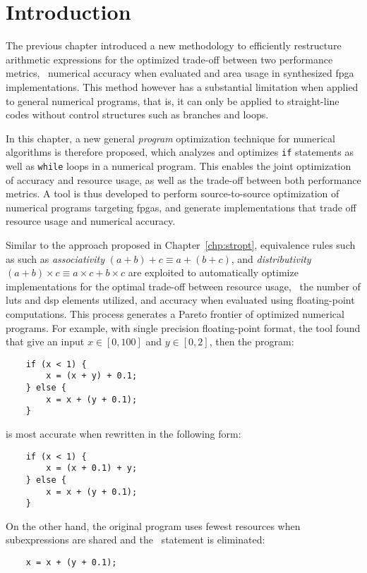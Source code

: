 \section{Introduction}
\label{po:sec:introduction}

The previous chapter introduced a new methodology to efficiently restructure
arithmetic expressions for the optimized trade-off between two performance
metrics, \ie~numerical accuracy when evaluated and area usage in synthesized
\gls{fpga} implementations.  This method however has a substantial limitation
when applied to general numerical programs, that is, it can only be applied to
straight-line codes without control structures such as branches and loops.

In this chapter, a new general \emph{program} optimization technique for
numerical algorithms is therefore proposed, which analyzes and optimizes
\texttt{if} statements as well as \texttt{while} loops in a numerical program.
This enables the joint optimization of accuracy and resource usage, as well
as the trade-off between both performance metrics.  A tool is thus developed
to perform source-to-source optimization of numerical programs targeting
\glspl{fpga}, and generate implementations that trade off resource usage and
numerical accuracy.


Similar to the approach proposed in Chapter~\ref{chp:stropt}, equivalence rules
such as such as \emph{associativity} $(a + b) + c \equiv a + (b + c)$, and
\emph{distributivity} $(a + b) \times c \equiv a \times c + b \times c$ are
exploited to automatically optimize implementations for the optimal trade-off
between resource usage, \ie~the number of \glspl{lut} and \gls{dsp} elements
utilized, and accuracy when evaluated using floating-point computations.  This
process generates a Pareto frontier of optimized numerical programs.  For
example, with single precision floating-point format, the tool found that give
an input $x \in [0, 100]$ and $y \in [0, 2]$, then the program:
\begin{lstlisting}
    if (x < 1) {
        x = (x + y) + 0.1;
    } else {
        x = x + (y + 0.1);
    }
\end{lstlisting}
is most accurate when rewritten in the following form:
\begin{lstlisting}
    if (x < 1) {
        x = (x + 0.1) + y;
    } else {
        x = x + (y + 0.1);
    }
\end{lstlisting}
On the other hand, the original program uses fewest resources when
subexpressions are shared and the \iflit~statement is eliminated:
\begin{lstlisting}
    x = x + (y + 0.1);
\end{lstlisting}

